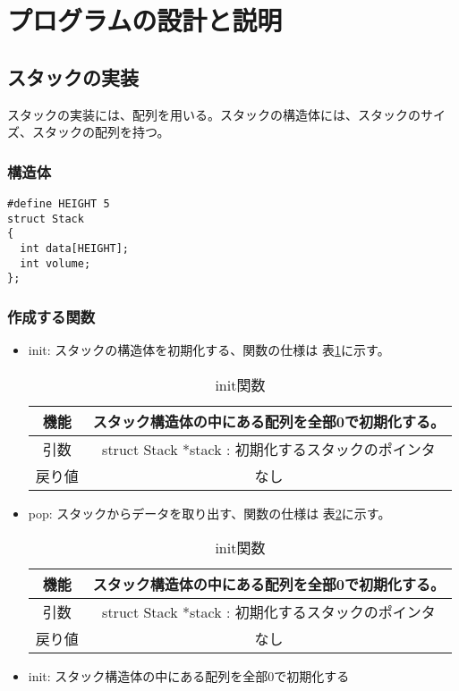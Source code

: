 \documentclass[a4paper,11pt]{jsarticle}
\begin{document}
\section{プログラムの設計と説明}
\subsection{スタックの実装}
スタックの実装には、配列を用いる。スタックの構造体には、スタックのサイズ、スタックの配列を持つ。
\subsubsection{構造体}
\begin{lstlisting}[caption={stack.h}, label={lst:stackh}]
#define HEIGHT 5
struct Stack
{
  int data[HEIGHT];
  int volume;
};
\end{lstlisting}
\subsubsection{作成する関数}
\begin{itemize}
  \item init: スタックの構造体を初期化する、関数の仕様は 表\ref{tab:init_func}に示す。
        \begin{table}[ht]
          \centering
          \begin{tabular}{|c|c|}
            \hline
            機能  & スタック構造体の中にある配列を全部0で初期化する。            \\
            \hline
            引数  & struct Stack *stack : 初期化するスタックのポインタ \\
            \hline
            戻り値 & なし                                   \\
            \hline
          \end{tabular}
          \caption{init関数}
          \label{tab:init_func}
        \end{table}
  \item pop: スタックからデータを取り出す、関数の仕様は 表\ref{tab:pop_func}に示す。
  \begin{table}[ht]
    \centering
    \begin{tabular}{|c|c|}
      \hline
      機能  & スタック構造体の中にある配列を全部0で初期化する。            \\
      \hline
      引数  & struct Stack *stack : 初期化するスタックのポインタ \\
      \hline
      戻り値 & なし                                   \\
      \hline
    \end{tabular}
    \caption{init関数}
    \label{tab:pop_func}
  \end{table}
  \item init: スタック構造体の中にある配列を全部0で初期化する


\end{itemize}
\end{document}
